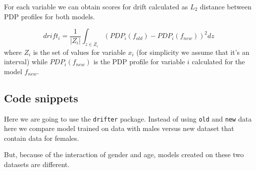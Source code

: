 \documentclass[12pt,]{krantz}
\begin{document}
For each variable we can obtain scores for drift calculated as \(L_2\) distance between PDP profiles for both models.

\[
drift_{i} = \frac 1 {|Z_i|}\int_{z\in Z_i} (PDP_i(f_{old}) - PDP_i(f_{new}))^2 dz
\]
where \(Z_i\) is the set of values for variable \(x_i\) (for simplicity we assume that it's an interval) while \(PDP_i(f_{new})\) is the PDP profile for variable \(i\) calculated for the model \(f_{new}\).

\hypertarget{code-snippets-2}{%
\subsection{Code snippets}\label{code-snippets-2}}

Here we are going to use the \texttt{drifter} package.
Instead of using \texttt{old} and \texttt{new} data here we compare model trained on data with males versus new dataset that contain data for females.

But, because of the interaction of gender and age, models created on these two datasets are different.
\end{document}

